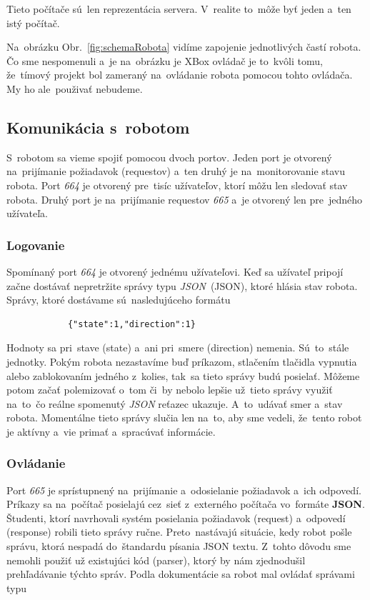 \noindent Tieto počítače sú~len reprezentácia servera. V~realite to~môže byť jeden a~ten istý počítač.

\noindent Na~obrázku Obr.~\ref{fig:schemaRobota} vidíme zapojenie jednotlivých častí robota. Čo sme nespomenuli a~je na~obrázku je XBox ovládač
je to~kvôli tomu, že~tímový projekt bol zameraný na~ovládanie robota pomocou tohto ovládača. My ho ale~použivať nebudeme.

\subsection{Komunikácia s~robotom}

S~robotom sa vieme spojiť pomocou dvoch portov. Jeden port je otvorený na~prijímanie požiadavok (requestov) a~ten druhý je na~monitorovanie
stavu robota. Port \textit{664} je otvorený pre~tisíc užívateľov, ktorí môžu len sledovať stav robota. Druhý port je na~prijímanie requestov
\textit{665} a~je otvorený len pre~jedného užívateľa.

\subsubsection{Logovanie}
\label{sec:logovanie}

	Spomínaný port \textit{664} je otvorený jednému užívateľovi. Keď sa užívateľ pripojí začne dostávať nepretržite správy typu
	\textit{JSON}~(\acrlong{JSON}), ktoré hlásia stav robota. Správy, ktoré dostávame sú~nasledujúceho formátu

	\begin{lstlisting}
			{"state":1,"direction":1}
	\end{lstlisting}

	Hodnoty sa pri~stave (state) a~ani pri~smere (direction) nemenia. Sú~to~stále jednotky. Pokým robota nezastavíme buď príkazom, stlačením
	tlačidla vypnutia alebo zablokovaním jedného z~kolies, tak~sa tieto správy budú posielať. Môžeme potom začať polemizovať o~tom či~by nebolo
	lepšie už~tieto správy využiť na~to~čo reálne spomenutý \textit{JSON} reťazec ukazuje. A~to~udávať smer a~stav robota. Momentálne tieto správy
	slučia len na~to, aby sme vedeli, že~tento robot je aktívny a~vie primať a~spracúvať informácie.

\subsubsection{Ovládanie}
\label{sec:ovladanie}

	Port \textit{665} je sprístupnený na~prijímanie a~odosielanie požiadavok a~ich odpovedí. Príkazy sa na~počítač posielajú cez~sieť z~externého
	počítača vo~formáte \textbf{JSON}. Študenti, ktorí navrhovali systém posielania požiadavok (request) a~odpovedí (response) robili tieto správy
	ručne. Preto~nastávajú situácie, kedy robot pošle správu, ktorá nespadá do~štandardu písania JSON textu. Z~tohto dôvodu sme nemohli použiť už
	existujúci kód (parser), ktorý by nám zjednodušil prehľadávanie týchto správ. Podla dokumentácie sa robot mal ovládať správami typu~\cite{BMdoc}

